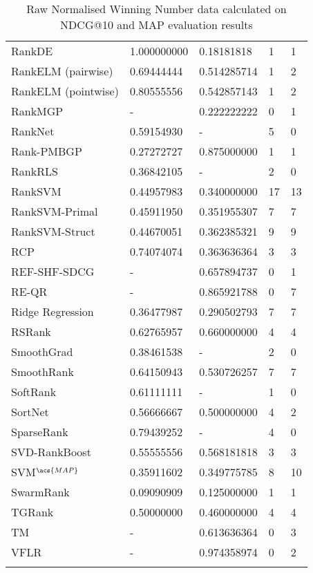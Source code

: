 \begin{longtable}{l|p{2.3cm}|p{2.3cm}|p{2.3cm}|p{2.33cm}}
RankDE & 1.000000000 & 0.18181818 & 1 & 1 \\ 
RankELM (pairwise) & 0.69444444 & 0.514285714 & 1 & 2 \\ 
RankELM (pointwise) & 0.80555556 & 0.542857143 & 1 & 2 \\
RankMGP & - & 0.222222222 & 0 & 1 \\ 
RankNet & 0.59154930 & - & 5 & 0 \\ 
Rank-PMBGP & 0.27272727 & 0.875000000 & 1 & 1 \\ 
Rank\acs{RLS} & 0.36842105 & - & 2 & 0 \\ 
Rank\acs{SVM} & 0.44957983 & 0.340000000 & 17 & 13 \\ 
Rank\acs{SVM}-Primal & 0.45911950 & 0.351955307 & 7 & 7 \\ 
Rank\acs{SVM}-Struct & 0.44670051 & 0.362385321 & 9 & 9 \\ 
RCP & 0.74074074 & 0.363636364 & 3 & 3 \\
REF-SHF-SDCG & - & 0.657894737 & 0 & 1 \\ 
RE-QR & - & 0.865921788 & 0 & 7 \\ 
Ridge Regression & 0.36477987 & 0.290502793 & 7 & 7 \\ 
RSRank & 0.62765957 & 0.660000000&  4 & 4 \\ 
SmoothGrad & 0.38461538 & - & 2 & 0 \\ 
SmoothRank & 0.64150943 & 0.530726257 & 7 & 7 \\ 
SoftRank & 0.61111111 & - & 1 & 0 \\ 
SortNet & 0.56666667 & 0.500000000 & 4 & 2 \\ 
SparseRank & 0.79439252 & - & 4 & 0 \\ 
\acs{SVD}-RankBoost & 0.55555556 & 0.568181818 & 3 & 3 \\ 
\acs{SVM}$^{\acs{MAP}}$ & 0.35911602 & 0.349775785 & 8 & 10 \\ 
SwarmRank & 0.09090909 & 0.125000000 & 1 & 1 \\ 
TGRank & 0.50000000 & 0.460000000 & 4 & 4 \\
TM & - & 0.613636364 & 0 & 3 \\ 
VFLR & - & 0.974358974 & 0 & 2 \\ 
\caption{Raw Normalised Winning Number data calculated on \acs{NDCG}@10 and \acs{MAP} evaluation results}
\label{tab:raw_data_norm_winnum_ndcg10map}
\end{longtable}